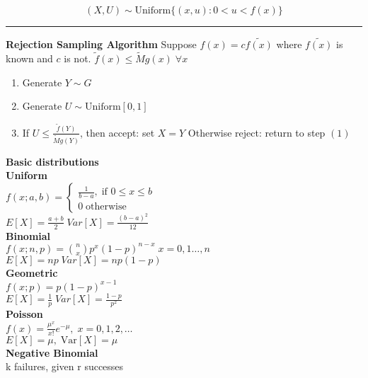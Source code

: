 \documentclass[10pt]{article} %
\begin{document}
\begin{multicols}{4}
{\begin{flushleft}
            \begin{equation*}
                (X,U) \sim \text{Uniform}\{(x,u): 0 < u < f(x)\}
            \end{equation*}
            \hrule
            \vspace{0.1cm}
            \textbf{Rejection Sampling Algorithm}
            Suppose \(f(x)= c \tilde{f(x)}\) where \(\tilde{f(x)}\) is
            known and \(c\) is not. \(\tilde{f}(x)\leq \tilde{M}g(x)\; \forall x\)
            \begin{enumerate}
                \item Generate \(Y\sim G\)
                \item Generate \(U \sim \text{Uniform}[0,1]\)
                \item If \(U \leq \frac{\tilde{f}(Y)}{\tilde{M}g(Y)}\), then accept: set \(X=Y\)
                      Otherwise reject: return to step \((1)\)
            \end{enumerate}
        \end{flushleft}
    }
    \columnbreak
    \vbox{
    \textbf{Basic distributions}\\
    {\small \textbf{Uniform}}\\
    \(
    f(x;a,b) = \begin{cases}
        \frac{1}{b-a}, \; \text{if } 0\leq x \leq b \\
        0 \; \text{otherwise}
    \end{cases} \)\\
    \(
    E[X] = \frac{a+b}{2}\;Var[X] = \frac{(b-a)^2}{12}
    \)\\
    {\small \textbf{Binomial}}\\
    \(
    f(x;n,p) = \binom{n}{x} p^{x} (1-p)^{n-x}\; x=0,1\dots,n \)\\
    \(
    E[X] =np\; Var[X] = np(1-p)
    \)\\
    {\small \textbf{Geometric}}\\
    \(
    f(x;p)  = p(1-p)^{x-1}
    \) \\
    \(
    E[X] = \frac{1}{p}\;Var[X] = \frac{1-p}{p^2}
    \)\\
    {\small \textbf{Poisson}}\\
    \(
    f(x)= \frac{\mu^x}{x!}e^{-\mu},\; x = 0,1,2,\dots
    \)\\
    \(
    E[X] = \mu,\; \text{Var}[X] = \mu
    \)\\
    {\small \textbf{Negative Binomial}}\\
    k failures, given r successes\\
}
\end{multicols}
\end{document}
